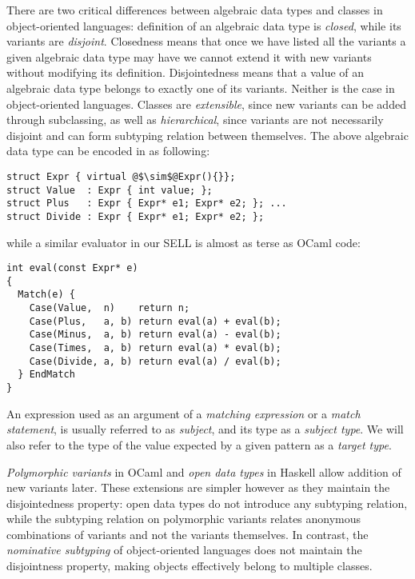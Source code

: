 \noindent
There are two critical differences between algebraic data types and classes in 
object-oriented languages: definition of an algebraic data type is \emph{closed}, 
while its variants are \emph{disjoint}. Closedness means that once we have listed 
all the variants a given algebraic data type may have we cannot extend it with 
new variants without modifying its definition. Disjointedness means that a value 
of an algebraic data type belongs to exactly one of its variants. Neither is 
the case in object-oriented languages. Classes are \emph{extensible},
since new variants can be added through subclassing, as well as 
\emph{hierarchical}, since variants are not necessarily disjoint and can form 
subtyping relation between themselves. The above algebraic data type can be 
encoded in \Cpp{} as following:

\begin{lstlisting}[columns=flexible]
struct Expr { virtual @$\sim$@Expr(){}};
struct Value  : Expr { int value; };
struct Plus   : Expr { Expr* e1; Expr* e2; }; ...
struct Divide : Expr { Expr* e1; Expr* e2; };
\end{lstlisting}

\noindent
while a similar evaluator in our SELL is almost as terse as OCaml code:

\begin{lstlisting}[columns=flexible]
int eval(const Expr* e)
{
  Match(e) {
    Case(Value,  n)    return n;
    Case(Plus,   a, b) return eval(a) + eval(b); 
    Case(Minus,  a, b) return eval(a) - eval(b);
    Case(Times,  a, b) return eval(a) * eval(b); 
    Case(Divide, a, b) return eval(a) / eval(b);
  } EndMatch
}
\end{lstlisting}

\noindent
An expression  used as an argument of a \emph{matching expression} or a 
\emph{match statement}, is usually referred to as \emph{subject}, and its type 
as a \emph{subject type}. We will also refer to the type of the value expected 
by a given pattern as a \emph{target type}.

\emph{Polymorphic variants} in OCaml\cite{garrigue-98} and \emph{open data 
types} in Haskell\cite{LohHinze2006} allow addition of new variants later. 
These extensions are simpler however as they maintain the 
disjointedness property: open data types do not introduce any subtyping relation, 
while the subtyping relation on polymorphic variants relates anonymous 
combinations of variants and not the variants themselves. In contrast, 
the \emph{nominative subtyping} of object-oriented languages does not maintain 
the disjointness property, making objects effectively belong to multiple classes. 


